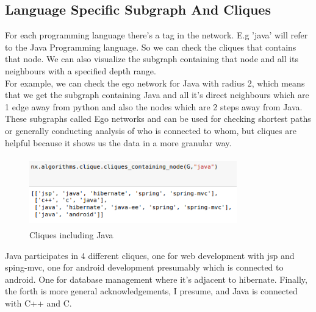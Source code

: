 \documentclass[12pt]{article}
\begin{document}
			\subsection{Language Specific Subgraph And Cliques}
				For each programming language there's a tag in the network. E.g 'java' will refer to the Java Programming language. So we can check the cliques that contains that node. We can also visualize the subgraph containing that node and all its neighbours with a specified depth range.\\
				For example, we can check the ego network for Java with radius 2, which means that we get the subgraph containing Java and all it's direct neighbours which are 1 edge away from python and also the nodes which are 2 steps away from Java.\\
				These subgraphs called Ego networks and can be used for checking shortest paths or generally conducting analysis of who is connected to whom, but cliques are helpful because it shows us the data in a more granular way.\\
					\begin{figure}[ht]
						\centering
						\includegraphics[width=9cm,height=3cm]{javacliq}
						\caption{Cliques including Java}
					\end{figure}
				\FloatBarrier
				Java participates in 4 different cliques, one for web development with jsp and sping-mvc, one for android development presumably which is connected to android. One for database management where it's adjacent to hibernate. Finally, the forth is more general acknowledgements, I presume, and Java is connected with C++ and C.
\end{document}
